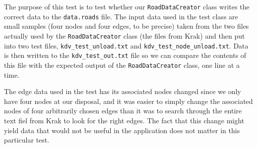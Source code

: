The purpose of this test is to test whether our \texttt{RoadDataCreator} class writes the correct data to the \texttt{data.roads} file. The input data used in the test class are small samples (four nodes and four edges, to be precise) taken from the two files actually used by the \texttt{RoadDataCreator} class (the files from Krak) and then put into two test files, \texttt{kdv\_test\_unload.txt} and \texttt{kdv\_test\_node\_unload.txt}. Data is then written to the \texttt{kdv\_test\_out.txt} file so we can compare the contents of this file with the expected output of the \texttt{RoadDataCreator} class, one line at a time.

The edge data used in the test has its associated nodes changed since we only have four nodes at our disposal, and it was easier to simply change the associated nodes of four arbitrarily chosen edges than it was to search through the entire text fiel from Krak to look for the right edges. The fact that this change might yield data that would not be useful in the application does not matter in this particular test.
